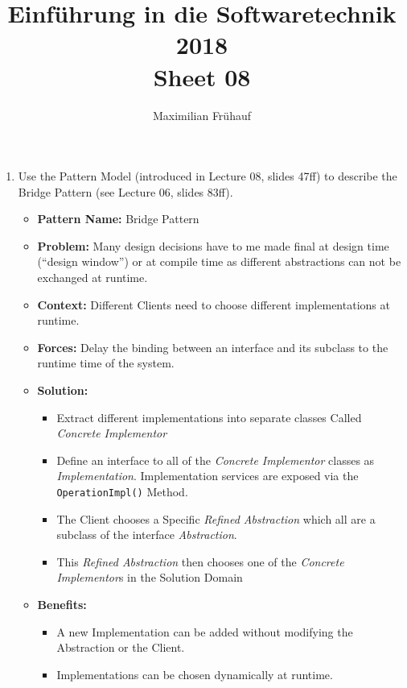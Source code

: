 \documentclass[a4paper, 10pt]{article}
\title{Einführung in die Softwaretechnik 2018 \\ Sheet 08}
\author{Maximilian Frühauf}
\begin{document}
\maketitle
\begin{enumerate}
    \item Use the Pattern Model (introduced in Lecture 08, slides 47ff) to describe the Bridge Pattern (see Lecture 06, slides 83ff).
    \vspace{0.5cm}

    \begin{itemize}
        \item \textbf{Pattern Name:} Bridge Pattern
        \item \textbf{Problem:} Many design decisions have to me made final at design time (“design window”) or at compile time
        as different abstractions can not be exchanged at runtime.
        \item \textbf{Context:} Different Clients need to choose different implementations at runtime.
        \item \textbf{Forces:} Delay the binding between an interface and its subclass to the runtime time of the system.
        \item \textbf{Solution:} 
        \begin{itemize}
            \item Extract different implementations into separate classes Called \textit{Concrete Implementor}
            \item Define an interface to all of the \textit{Concrete Implementor} classes as \textit{Implementation}. 
            Implementation services are exposed via the \verb+OperationImpl()+ Method.
            \item The Client chooses a Specific \textit{Refined Abstraction} which all are a subclass of the interface
            \textit{Abstraction}. 
            \item This \textit{Refined Abstraction} then chooses one of the \textit{Concrete Implementor}s in the Solution Domain
        \end{itemize}
        \item \textbf{Benefits:}
        \begin{itemize}
            \item A new Implementation can be added without modifying the Abstraction or the Client.
            \item Implementations can be chosen dynamically at runtime.
        \end{itemize}

\end{itemize}
\end{enumerate}
\end{document}

